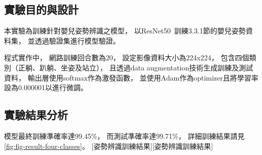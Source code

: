 \documentclass[class=NCU_thesis, crop=false]{standalone}
\begin{document}
\subsection{實驗目的與設計}
本實驗為訓練針對嬰兒姿勢辨識之模型，
以ResNet50~\cite{he_deep_2016}訓練3.3.1節的嬰兒姿勢資料集，
並透過驗證集進行模型驗證。

程式實作中，
網路訓練回合數為20，
設定影像資料大小為224x224，
包含四個類別（正躺、趴躺、坐姿及站立），
且透過data augmentation技術生成訓練及測試資料，
輸出層使用softmax作為激發函數，
並使用Adam作為optimizer且將學習率設為0.000001以進行微調。

\subsection{實驗結果分析}
模型最終訓練準確率達99.45\%，
而測試準確率達99.71\%，
詳細訓練結果請見\cref{fig:fig-result-four-classes}。
[姿勢辨識訓練結果][姿勢辨識訓練結果]
\end{document}

